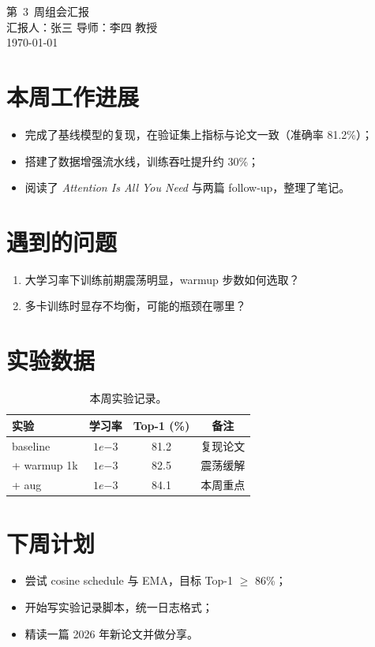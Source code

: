 \documentclass[zihao=-4, a4paper]{ctexart}
\newcommand{\weekinfo}{第~3~周组会汇报}
\newcommand{\reporter}{汇报人：张三 \quad 导师：李四 教授}
\begin{document}
\begin{center}
  {\heiti \weekinfo}\\[0.5em]
  { \reporter}\\[0.2em]
  { \today}
\end{center}

\section{本周工作进展}
\begin{itemize}[leftmargin=1.5em]
  \item 完成了基线模型的复现，在验证集上指标与论文一致（准确率 81.2\%）；
  \item 搭建了数据增强流水线，训练吞吐提升约 30\%；
  \item 阅读了 \textit{Attention Is All You Need} 与两篇 follow-up，整理了笔记。
\end{itemize}

\section{遇到的问题}
\begin{enumerate}[label=\textbf{Q\arabic*.}, leftmargin=2.2em]
  \item 大学习率下训练前期震荡明显，warmup 步数如何选取？
  \item 多卡训练时显存不均衡，可能的瓶颈在哪里？
\end{enumerate}

\section{实验数据}
\begin{table}[h]
  \centering
  \caption{本周实验记录。}
  \begin{tabular}{lccc}
    \toprule
    实验 & 学习率 & Top-1 (\%) & 备注 \\
    \midrule
    baseline      & $1e{-3}$ & 81.2 & 复现论文 \\
    + warmup 1k   & $1e{-3}$ & 82.5 & 震荡缓解 \\
    + aug         & $1e{-3}$ & 84.1 & 本周重点 \\
    \bottomrule
  \end{tabular}
\end{table}

\section{下周计划}
\begin{itemize}[leftmargin=1.5em]
  \item 尝试 cosine schedule 与 EMA，目标 Top-1 $\ge$ 86\%；
  \item 开始写实验记录脚本，统一日志格式；
  \item 精读一篇 2026 年新论文并做分享。
\end{itemize}
\end{document}
